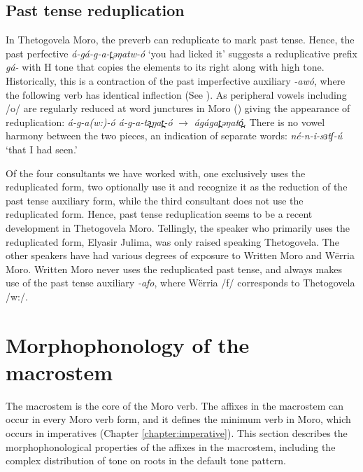 \subsection{Past tense reduplication}\label{sec:ch11:past}

In Thetogovela Moro, the preverb can reduplicate to mark past tense. Hence, the past perfective \textit{á-gá-g-a-t̪əŋatw-ó} ‘you had licked it’ suggests a reduplicative prefix \textit{gá-} with H tone that copies the elements to its right along with high tone. Historically, this is a contraction of the past imperfective auxiliary \textit{-awó}, where the following verb has identical inflection (See ). As peripheral vowels including /o/ are regularly reduced at word junctures in Moro ()  giving the appearance of reduplication: \textit{á-g-a(w:)-ó á-g-a-tə̪ŋat̪-ó} $\rightarrow$ \textit{ágágat̪əŋató̪}. There is no vowel harmony between the two pieces, an indication of separate words: \textit{né-n-i-sɜtʃ-ú} ‘that I had seen.’ %

Of the four consultants we have worked with, one exclusively uses the reduplicated form, two optionally use it and recognize it as the reduction of the past tense auxiliary form, while the third consultant does not use the reduplicated form. Hence, past tense reduplication seems to be a recent development in Thetogovela Moro. Tellingly, the speaker who primarily uses the reduplicated form, Elyasir Julima, was only raised speaking Thetogovela. The other speakers have had various degrees of exposure to Written Moro and Wërria Moro. Written Moro never uses the reduplicated past tense, and always makes use of the past tense auxiliary \textit{-afo}, where Wërria /f/ corresponds to Thetogovela /w:/. %


\section{Morphophonology of the macrostem}\label{sec:ch11:macrostem}

The macrostem is the core of the Moro verb. The affixes in the macrostem can occur in every Moro verb form, and it defines the minimum verb in Moro, which occurs in imperatives (Chapter \ref{chapter:imperative}). This section describes the morphophonological properties of the affixes in the macrostem, including the complex distribution of tone on roots in the default tone pattern.  

